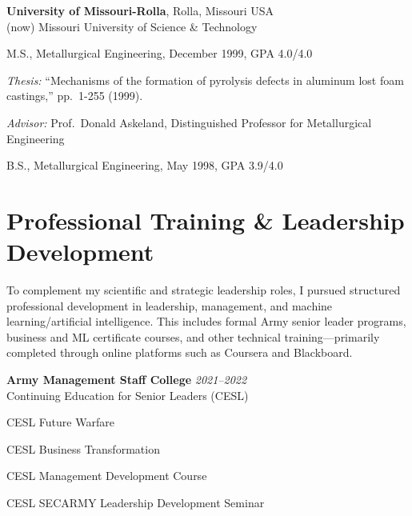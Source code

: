 {\bf University of Missouri-Rolla}, Rolla, Missouri USA\\
{(now) Missouri University of Science \& Technology}\\
\vspace*{-.1in}
\begin{list1}
\item[] M.S., Metallurgical Engineering,  December 1999, GPA 4.0/4.0
\begin{list2}
\vspace*{.05in}
\item {\em Thesis:}  ``Mechanisms of the formation of pyrolysis defects in aluminum lost foam castings,'' pp.\ 1-255 (1999).
\item {\em Advisor:}  Prof.~Donald Askeland, Distinguished Professor for Metallurgical Engineering 
\end{list2}
\vspace*{.05in}
\item[] B.S., Metallurgical Engineering, May 1998, GPA 3.9/4.0
\end{list1}

\section{\sc Professional Training \& Leadership Development}

To complement my scientific and strategic leadership roles, I pursued structured professional development in leadership, management, and machine learning/artificial intelligence. This includes formal Army senior leader programs, business and ML certificate courses, and other technical training—primarily completed through online platforms such as Coursera and Blackboard.

\vspace{-0.05in}
{\bf Army Management Staff College} \hfill {\it 2021--2022} \\
Continuing Education for Senior Leaders (CESL)
\begin{list1}
\vspace*{.05in}
\item[] CESL Future Warfare
\item[] CESL Business Transformation
\item[] CESL Management Development Course
\item[] CESL SECARMY Leadership Development Seminar
\end{list1}

